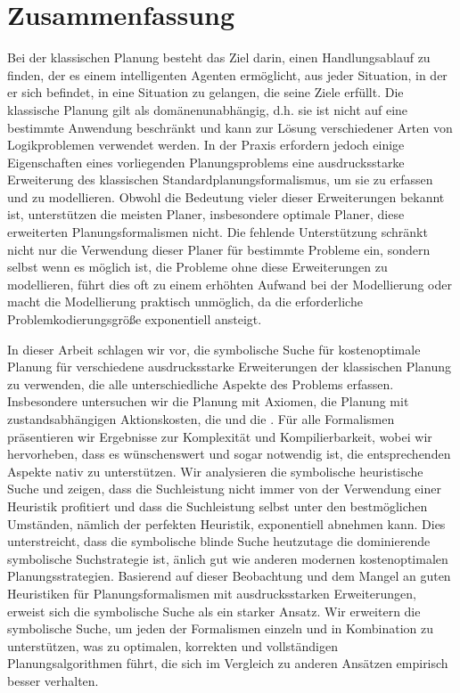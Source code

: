 \thispagestyle{empty}

\chapter*{Zusammenfassung}
Bei der klassischen Planung besteht das Ziel darin, einen Handlungsablauf zu finden, der es einem intelligenten Agenten erm{\"o}glicht, aus jeder Situation, in der er sich befindet, in eine Situation zu gelangen, die seine Ziele erf{\"u}llt.
Die klassische Planung gilt als dom{\"a}nenunabh{\"a}ngig, d.h. sie ist nicht auf eine bestimmte Anwendung beschr{\"a}nkt und kann zur L{\"o}sung verschiedener Arten von Logikproblemen verwendet werden.
In der Praxis erfordern jedoch einige Eigenschaften eines vorliegenden Planungsproblems eine ausdrucksstarke Erweiterung des klassischen Standardplanungsformalismus, um sie zu erfassen und zu modellieren. 
Obwohl die Bedeutung vieler dieser Erweiterungen bekannt ist, unterst{\"u}tzen die meisten Planer, insbesondere optimale Planer, diese erweiterten Planungsformalismen nicht. 
Die fehlende Unterst{\"u}tzung schr{\"a}nkt nicht nur die Verwendung dieser Planer f{\"u}r bestimmte Probleme ein, sondern selbst wenn es m{\"o}glich ist, die Probleme ohne diese Erweiterungen zu modellieren, f{\"u}hrt dies oft zu einem erh{\"o}hten Aufwand bei der Modellierung oder macht die Modellierung praktisch unm{\"o}glich, da die erforderliche Problemkodierungsgr{\"o}{\ss}e exponentiell ansteigt.

In dieser Arbeit schlagen wir vor, die symbolische Suche f{\"u}r kostenoptimale Planung f{\"u}r verschiedene ausdrucksstarke Erweiterungen der klassischen Planung zu verwenden, die alle unterschiedliche Aspekte des Problems erfassen.
Insbesondere untersuchen wir die Planung mit Axiomen, die Planung mit zustandsabh{\"a}ngigen Aktionskosten, die  und die . 
F{\"u}r alle Formalismen pr{\"a}sentieren wir Ergebnisse zur Komplexit{\"a}t und Kompilierbarkeit, wobei wir hervorheben, dass es w{\"u}nschenswert und sogar notwendig ist, die entsprechenden Aspekte nativ zu unterst{\"u}tzen.
Wir analysieren die symbolische heuristische Suche und zeigen, dass die Suchleistung nicht immer von der Verwendung einer Heuristik profitiert und dass die Suchleistung selbst unter den bestm{\"o}glichen Umst{\"a}nden, n{\"a}mlich der perfekten Heuristik, exponentiell abnehmen kann.
Dies unterstreicht, dass die symbolische blinde Suche heutzutage die dominierende symbolische Suchstrategie ist, {\"a}nlich gut wie anderen modernen kostenoptimalen Planungsstrategien.
Basierend auf dieser Beobachtung und dem Mangel an guten Heuristiken f{\"u}r Planungsformalismen mit ausdrucksstarken Erweiterungen, erweist sich die symbolische Suche als ein starker Ansatz.
Wir erweitern die symbolische Suche, um jeden der Formalismen einzeln und in Kombination zu unterst{\"u}tzen, was zu optimalen, korrekten und vollst{\"a}ndigen Planungsalgorithmen f{\"u}hrt, die sich im Vergleich zu anderen Ans{\"a}tzen empirisch besser verhalten.

